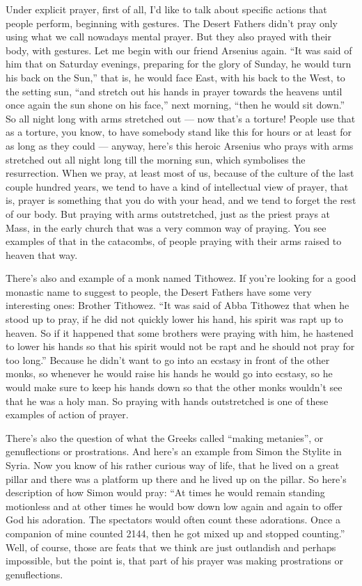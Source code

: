 Under explicit prayer, first of all, I'd like to talk about specific actions that people perform, beginning with gestures. The Desert Fathers didn't pray only using what we call nowadays mental prayer. But they also prayed with their body, with gestures. Let me begin with our friend Arsenius again. ``It was said of him that on Saturday evenings, preparing for the glory of Sunday, he would turn his back on the Sun,'' that is, he would face East, with his back to the West, to the setting sun, ``and stretch out his hands in prayer towards the heavens until once again the sun shone on his face,'' next morning, ``then he would sit down.'' So all night long with arms stretched out --- now that's a torture! People use that as a torture, you know, to have somebody stand like this for hours or at least for as long as they could --- anyway, here's this heroic Arsenius who prays with arms stretched out all night long till the morning sun, which symbolises the resurrection. When we pray, at least most of us, because of the culture of the last couple hundred years, we tend to have a kind of intellectual view of prayer, that is, prayer is something that you do with your head, and we tend to forget the rest of our body. But praying with arms outstretched, just as the priest prays at Mass, in the early church that was a very common way of praying. You see examples of that in the catacombs, of people praying with their arms raised to heaven that way.

There's also and example of a monk named Tithowez. If you're looking for a good monastic name to suggest to people, the Desert Fathers have some very interesting ones: Brother Tithowez. ``It was said of Abba Tithowez that when he stood up to pray, if he did not quickly lower his hand, his spirit was rapt up to heaven. So if it happened that some brothers were praying with him, he hastened to lower his hands so that his spirit would not be rapt and he should not pray for too long.'' Because he didn't want to go into an ecstasy in front of the other monks, so whenever he would raise his hands he would go into ecstasy, so he would make sure to keep his hands down so that  the other monks wouldn't see that he was a holy man. So praying with hands outstretched is one of these examples of action of prayer.

There's also the question of what the Greeks called ``making metanies'', or genuflections or prostrations. And here's an example from Simon the Stylite in Syria. Now you know of his rather curious way of life, that he lived on a great pillar and there was a platform up there and he lived up on the pillar. So here's description of how Simon would pray: ``At times he would remain standing motionless and at other times he would bow down low again and again to offer God his adoration. The spectators would often count these adorations. Once a companion of mine counted 2144, then he got mixed up and stopped counting.'' Well, of course, those are feats that we think are just outlandish and perhaps impossible, but the point is, that part of his prayer was making prostrations or genuflections.

